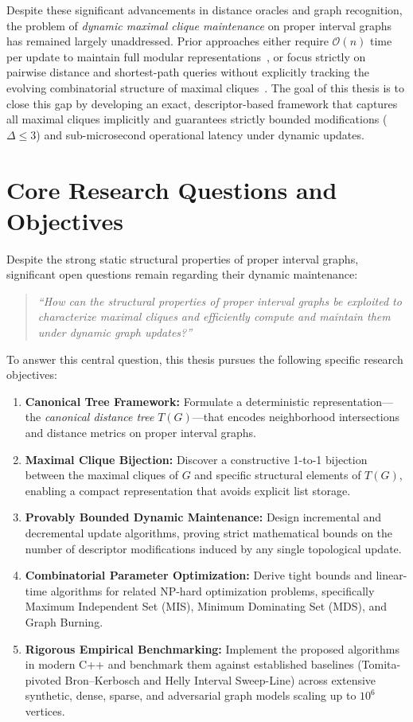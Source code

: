 Despite these significant advancements in distance oracles and graph recognition, the problem of \emph{dynamic maximal clique maintenance} on proper interval graphs has remained largely unaddressed. Prior approaches either require $\mathcal{O}(n)$ time per update to maintain full modular representations~\cite{crespelle2019fully}, or focus strictly on pairwise distance and shortest-path queries without explicitly tracking the evolving combinatorial structure of maximal cliques~\cite{chen2024distance,he2020distance}. The goal of this thesis is to close this gap by developing an exact, descriptor-based framework that captures all maximal cliques implicitly and guarantees strictly bounded modifications ($\Delta \le 3$) and sub-microsecond operational latency under dynamic updates.

\section{Core Research Questions and Objectives}
\label{sec:intro_objectives}

Despite the strong static structural properties of proper interval graphs, significant open questions remain regarding their dynamic maintenance:
\begin{quote}
    \itshape
    ``How can the structural properties of proper interval graphs be exploited to characterize maximal cliques and efficiently compute and maintain them under dynamic graph updates?''
\end{quote}

To answer this central question, this thesis pursues the following specific research objectives:
\begin{enumerate}[label=\textbf{O\arabic*.}]
    \item \textbf{Canonical Tree Framework:} Formulate a deterministic representation---the \emph{canonical distance tree} $T(G)$---that encodes neighborhood intersections and distance metrics on proper interval graphs.
    \item \textbf{Maximal Clique Bijection:} Discover a constructive 1-to-1 bijection between the maximal cliques of $G$ and specific structural elements of $T(G)$, enabling a compact representation that avoids explicit list storage.
    \item \textbf{Provably Bounded Dynamic Maintenance:} Design incremental and decremental update algorithms, proving strict mathematical bounds on the number of descriptor modifications induced by any single topological update.
    \item \textbf{Combinatorial Parameter Optimization:} Derive tight bounds and linear-time algorithms for related NP-hard optimization problems, specifically Maximum Independent Set (MIS), Minimum Dominating Set (MDS), and Graph Burning.
    \item \textbf{Rigorous Empirical Benchmarking:} Implement the proposed algorithms in modern C++ and benchmark them against established baselines (Tomita-pivoted Bron--Kerbosch and Helly Interval Sweep-Line) across extensive synthetic, dense, sparse, and adversarial graph models scaling up to $10^6$ vertices.
\end{enumerate}

